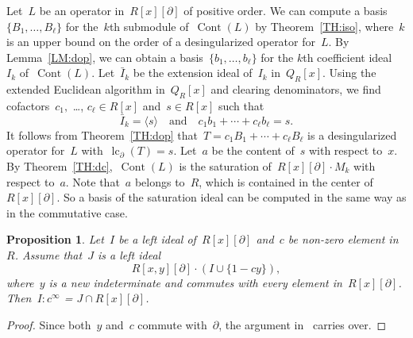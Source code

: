 \documentclass{sig-alternate}
\newcommand{\cont}{\operatorname{Cont}}
\newcommand{\lc}{\operatorname{lc}}
\newcommand{\pa}{\partial}
\newtheorem{prop}[theorem]{Proposition}
\begin{document}
Let~$L$ be an operator in~$ R[x][\pa]$ of positive order. We can compute a basis~$\{B_1, \ldots, B_{\ell}\}$ for the~$k$th submodule of~$\cont(L)$ by Theorem~\ref{TH:iso}, where~$k$
is an upper bound on the order of a desingularized operator for~$L$. By Lemma~\ref{LM:dop}, we can obtain a basis~$\{b_1, \ldots, b_{\ell}\}$ for the $k$th coefficient ideal~$I_k$ of~$\cont(L)$. Let~$\bar{I}_k$ be the extension ideal of~$I_k$ in~$Q_R[x]$. Using the extended Euclidean algorithm in~$Q_R[x]$ and clearing denominators, we find
cofactors~$c_1,$ \ldots, $c_\ell \in R[x]$ and~$s \in R[x]$ such that
\[     \bar{I}_k = \langle s  \rangle \quad \text{and} \quad c_1 b_1 + \cdots + c_\ell b_\ell = s. \]
It follows from Theorem~\ref{TH:dop} that~$T=c_1 B_1 + \cdots + c_\ell B_\ell$ is a desingularized operator for~$L$ with~$\lc_\pa(T)=s$.
Let~$a$ be the content of~$s$ with respect to~$x$.
By Theorem~\ref{TH:dc},~$\cont(L)$ is the saturation of~$R[x][\pa] \cdot M_k$ with respect to~$a$.
Note that~$a$ belongs to~$R$, which is contained in the center of~$R[x][\pa]$. So a basis of the saturation ideal
can be computed in the same way as in the commutative case.





\begin{prop}\label{PROP:saconst}
 Let~$I$ be a left ideal of~$R[x][\pa]$ and~$c$ be non-zero element in~$R$. Assume that~$J$ is a left ideal~
$$R[x, y][\pa] \cdot \left( I \cup \{ 1 -c y \} \right),$$
where~$y$ is a new indeterminate and commutes with every element in~$R[x][\pa]$.
 Then~$I : c^{\infty}$ = $J \cap R[x][\pa]$.
\end{prop}
\begin{proof}
Since both~$y$ and~$c$ commute with~$\pa$, the argument in~\cite[page 266, Proposition 6.37]{Weispfenning1993}
carries over.
\end{proof}
\end{document}
